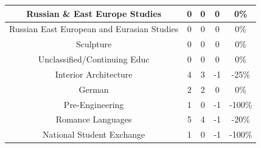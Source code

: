 \documentclass[10pt]{article}
\begin{document}
\begin{longtable}[c]{|ccccc|}
	\multicolumn{1}{|c|}{Russian \& East Europe Studies}             & \multicolumn{1}{c|}{0}                               & \multicolumn{1}{c|}{0}                                   & \multicolumn{1}{c|}{0}                  & 0\%                   \\ \hline
	\multicolumn{1}{|c|}{Russian East European and Eurasian Studies} & \multicolumn{1}{c|}{0}                               & \multicolumn{1}{c|}{0}                                   & \multicolumn{1}{c|}{0}                  & 0\%                   \\ \hline
	\multicolumn{1}{|c|}{Sculpture}                                  & \multicolumn{1}{c|}{0}                               & \multicolumn{1}{c|}{0}                                   & \multicolumn{1}{c|}{0}                  & 0\%                   \\ \hline
	\multicolumn{1}{|c|}{Unclassified/Continuing Educ}               & \multicolumn{1}{c|}{0}                               & \multicolumn{1}{c|}{0}                                   & \multicolumn{1}{c|}{0}                  & 0\%                   \\ \hline
	\multicolumn{1}{|c|}{Interior Architecture}                      & \multicolumn{1}{c|}{4}                               & \multicolumn{1}{c|}{3}                                   & \multicolumn{1}{c|}{-1}                 & -25\%                 \\ \hline
	\multicolumn{1}{|c|}{German}                                     & \multicolumn{1}{c|}{2}                               & \multicolumn{1}{c|}{2}                                   & \multicolumn{1}{c|}{0}                  & 0\%                   \\ \hline
	\multicolumn{1}{|c|}{Pre-Engineering}                            & \multicolumn{1}{c|}{1}                               & \multicolumn{1}{c|}{0}                                   & \multicolumn{1}{c|}{-1}                 & -100\%                \\ \hline
	\multicolumn{1}{|c|}{Romance Languages}                          & \multicolumn{1}{c|}{5}                               & \multicolumn{1}{c|}{4}                                   & \multicolumn{1}{c|}{-1}                 & -20\%                 \\ \hline
	\multicolumn{1}{|c|}{National Student Exchange}                  & \multicolumn{1}{c|}{1}                               & \multicolumn{1}{c|}{0}                                   & \multicolumn{1}{c|}{-1}                 & -100\%                \\ \hline

\end{longtable}
\end{document}
